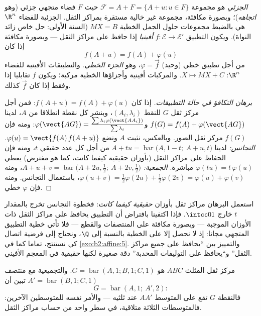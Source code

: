 \begin{definition}\label{def:b2:affine:subspace}
\emph{ الجزئي} هو مجموعة $\mathcal{F} = A + F = \{A + u :
u \in F\}$ حيث $F$ فضاء متجهي
جزئي (وهو \emph{اتجاهه})؛ وبصورة مكافئة، مجموعة غير خالية مستقرة
بمراكز الثقل.  الجزئية للفضاء $\R^n$ هي بالضبط
مجموعات حلول الجمل الخطية $MX = B$ (السنة الأولى: حل خاص زائد النواة).
ويكون التطبيق $f \colon
\mathcal{E} \to \mathcal{E}'$ \emph{أفينيا} إذا حافظ على
مراكز الثقل --- وبصورة مكافئة إذا كان
\[
f(A + u) = f(A) + \varphi(u)
\]
من أجل تطبيق خطي (وحيد) $\varphi = \vec f$، وهو \emph{الجزء الخطي}. والتطبيقات
الأفينية للفضاء $\R^n$: $X \mapsto MX + C$. والمركبات أفينية وأجزاؤها الخطية
مركبة؛ ويكون $f$ تقابليا إذا وفقط إذا كان $\vec f$ كذلك.
\end{definition}

\begin{proof}[برهان التكافؤ في حالة التطبيقات]
إذا كان $f(A + u) = f(A) + \varphi(u)$: فمن أجل مركز ثقل $G$ للنقط $(A_i,
\lambda_i)$، وبنشر كل نقطة
انطلاقا من $A$، لدينا $f(G) = f(A) +
\varphi(\vect{AG})$ و$\varphi(\vect{AG}) =
\frac{\sum\lambda_i\varphi(\vect{AA_i})}{\sum\lambda_i}$: ومنه فإن $f(G)$ مركز ثقل
الصور. وبالعكس، نثبت $A$ ونضع $\varphi(u) = \vect{f(A)\,f(A + u)}$. \emph{التجانس:} لدينا $A + tu =
\operatorname{bar}\bigl(A, 1-t;\ A + u, t\bigr)$
من أجل كل عدد حقيقي $t$، ومنه فإن الحفاظ على مراكز الثقل (بأوزان
حقيقية كيفما كانت، كما هو مفترض) يعطي $\varphi(tu) = t\,\varphi(u)$ مباشرة.
\emph{الجمعية:} $A + u + v = \operatorname{bar}\bigl(A + 2u,
\tfrac12;\ A + 2v, \tfrac12\bigr)$، ومنه $\varphi(u + v) =
\tfrac12\varphi(2u) + \tfrac12\varphi(2v) = \varphi(u) +
\varphi(v)$، باستعمال التجانس. ومنه فإن $\varphi$
خطي.
\end{proof}

\begin{remark}
استعمل البرهان مراكز ثقل بأوزان \emph{حقيقية كيفما كانت}: فخطوة
التجانس تخرج بالمقدار $t$ خارج $\intcc01$.
فإذا اكتفينا بافتراض أن التطبيق يحافظ على مراكز الثقل ذات الأوزان
الموجبة --- وبصورة مكافئة على المنتصفات والقطع --- فلا تأتي خطية
التطبيق المتجهي مجانا: إذ لا نحصل إلا على الخطية بالنسبة إلى $\Q$،
ونحتاج إلى فرضية اتصال كي نستنتج، تماما كما في
\cref{exo:b2:affine:5}. والتمييز بين ``يحافظ على جميع مراكز الثقل'' و``يحافظ على
التوليفات المحدبة'' دقة صغيرة لكنها حقيقية في المعجم الأفيني.
\end{remark}

\begin{example}\label{ex:b2:affine:median}
مركز ثقل المثلث $ABC$ هو  $G =
\operatorname{bar}(A,1; B,1; C,1)$. والتجميعية مع منتصف
$A' = \operatorname{bar}(B, 1; C, 1)$ تبين أن
\[
G = \operatorname{bar}(A, 1;\ A', 2) :
\]
فالنقطة $G$ تقع على المتوسط $AA'$ عند ثلثيه --- والأمر نفسه
للمتوسطين الآخرين: فالمتوسطات الثلاثة متلاقية، في سطر واحد من حساب
مراكز الثقل.
\end{example}

